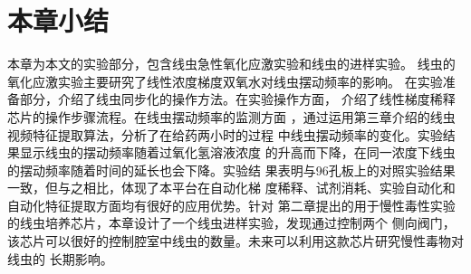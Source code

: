 \section{本章小结}
	本章为本文的实验部分，包含线虫急性氧化应激实验和线虫的进样实验。
	线虫的氧化应激实验主要研究了线性浓度梯度双氧水对线虫摆动频率的影响。
	在实验准备部分，介绍了线虫同步化的操作方法。在实验操作方面，
	介绍了线性梯度稀释芯片的操作步骤流程。在线虫摆动频率的监测方面
	，通过运用第三章介绍的线虫视频特征提取算法，分析了在给药两小时的过程
	中线虫摆动频率的变化。实验结果显示线虫的摆动频率随着过氧化氢溶液浓度
	的升高而下降，在同一浓度下线虫的摆动频率随着时间的延长也会下降。实验结
	果表明与96孔板上的对照实验结果一致，但与之相比，体现了本平台在自动化梯
	度稀释、试剂消耗、实验自动化和自动化特征提取方面均有很好的应用优势。针对
	第二章提出的用于慢性毒性实验的线虫培养芯片，本章设计了一个线虫进样实验，发现通过控制两个
	侧向阀门，该芯片可以很好的控制腔室中线虫的数量。未来可以利用这款芯片研究慢性毒物对线虫的
	长期影响。